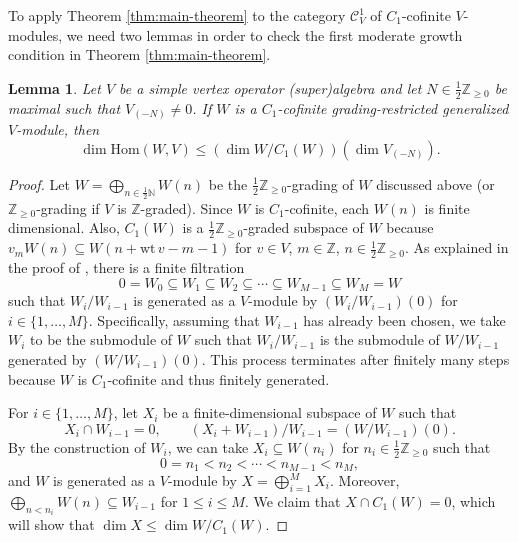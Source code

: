 \documentclass[11pt, reqno]{amsart}
\newtheorem{lem}[thm]{Lemma}
\theoremstyle{definition}\newtheorem{defi}[thm]{Definition}
\theoremstyle{definition}\newtheorem{rem}[thm]{Remark}
\theoremstyle{definition}\newtheorem{exam}[thm]{Example}
\theoremstyle{definition}\newtheorem{assum}[thm]{Assumption}
\newcommand{\cC}{\mathcal{C}}
\newcommand{\ZZ}{\mathbb{Z}}
\newcommand{\NN}{\mathbb{N}}
\begin{document}
To apply Theorem \ref{thm:main-theorem} to the category $\cC^1_V$ of $C_1$-cofinite $V$-modules, we need two lemmas in order to check the first moderate growth condition in Theorem \ref{thm:main-theorem}.
\begin{lem}\label{lem:C1-est-hom}
Let $V$ be a simple vertex operator (super)algebra and let $N\in\frac{1}{2}\ZZ_{\geq 0}$ be maximal such that $V_{(-N)}\neq 0$. If $W$ is a $C_1$-cofinite grading-restricted generalized $V$-module, then 
\begin{equation*}
\dim \mathrm{Hom}(W,V)\leq(\dim W/C_1(W))(\dim V_{(-N)}).
\end{equation*}
\end{lem}
\begin{proof}
Let $W=\bigoplus_{n\in\frac{1}{2}\NN} W(n)$ be the $\frac{1}{2}\ZZ_{\geq 0}$-grading of $W$ discussed above (or $\ZZ_{\geq 0}$-grading if $V$ is $\ZZ$-graded). Since $W$ is $C_1$-cofinite, each $W(n)$ is finite dimensional. Also, $C_1(W)$ is a $\frac{1}{2}\ZZ_{\geq 0}$-graded subspace of $W$ because $v_m W(n)\subseteq W(n+\mathrm{wt}\,v-m-1)$ for $v\in V$, $m\in\ZZ$, $n\in\frac{1}{2}\ZZ_{\geq 0}$. As explained in the proof of \cite[Theorem 3.7]{CY}, there is a finite filtration
\begin{equation*}
0= W_0\subseteq W_1\subseteq W_2\subseteq\cdots\subseteq W_{M-1}\subseteq W_M=W
\end{equation*}
such that $W_i/W_{i-1}$ is generated as a $V$-module by $(W_i/W_{i-1})(0)$ for $i\in\lbrace 1,\ldots, M\rbrace$. Specifically, assuming that $W_{i-1}$ has already been chosen, we take $W_i$ to be the submodule of $W$ such that $W_i/W_{i-1}$ is the submodule of $W/W_{i-1}$ generated by $(W/W_{i-1})(0)$. This process terminates after finitely many steps because $W$ is $C_1$-cofinite and thus finitely generated.

For $i\in\lbrace 1,\ldots, M\rbrace$, let $X_i$ be a finite-dimensional subspace of $W$ such that 
\begin{equation*}
X_i\cap W_{i-1}=0,\qquad (X_i+W_{i-1})/W_{i-1} = (W/W_{i-1})(0).
\end{equation*}
 By the construction of $W_i$, we can take $X_i\subseteq W(n_i)$ for $n_i\in\frac{1}{2}\ZZ_{\geq 0}$ such that 
\begin{equation*}
0 = n_1<n_2<\cdots <n_{M-1}<n_M,
\end{equation*}
and $W$ is generated as a $V$-module by $X=\bigoplus_{i=1}^M X_i$. Moreover, $\bigoplus_{n<n_i} W(n)\subseteq W_{i-1}$ for $1\leq i\leq M$. We claim that $X\cap C_1(W)=0$, which will show that $\dim X\leq \dim W/C_1(W)$.


\end{proof}
\end{document}
